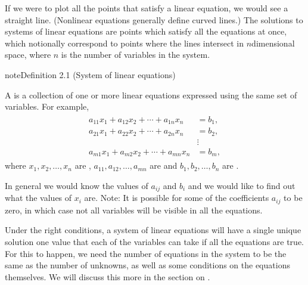 \documentclass[letterpaper,10pt,english]{jupyterBook}
\begin{document}
\sphinxAtStartPar
If we were to plot all the points that satisfy a linear equation, we would see a straight line. (Nonlinear equations generally define curved lines.) The solutions to systems of linear equations are points which satisfy all the equations at once, which notionally correspond to points where the lines intersect in \(n\)\sphinxhyphen{}dimensional space, where \(n\) is the number of variables in the system.
\label{_pages/2.0_Linear_systems:system-of-linear-equation-definition}
\begin{sphinxadmonition}{note}{Definition 2.1 (System of linear equations)}



\sphinxAtStartPar
A  is a collection of one or more linear equations expressed using the same set of variables. For example,
\begin{equation*}
\begin{split} \begin{align*}
    a_{11} x_1+a_{12} x_2+\cdots +a_{1n}x_n &=b_1, \\
    a_{21} x_1+a_{22} x_2+\cdots+a_{2n}x_n &=b_2, \\
    &\vdots \\
    a_{m1} x_1+a_{m2} x_2+\cdots+a_{mn}x_n &=b_m,
\end{align*} \end{split}
\end{equation*}
\sphinxAtStartPar
where \(x_1, x_2, \ldots, x_n\) are , \(a_{11}, a_{12}, \ldots, a_{mn}\) are  and \(b_1, b_2, \ldots, b_n\) are .
\end{sphinxadmonition}

\sphinxAtStartPar
In general we would know the values of \(a_{ij}\) and \(b_i\) and we would like to find out what the values of \(x_i\) are. Note: It is possible for some of the coefficients \(a_{ij}\) to be zero, in which case not all variables will be visible in all the equations.

\sphinxAtStartPar
Under the right conditions, a system of linear equations will have a single unique solution \sphinxhyphen{} one value that each of the variables can take if all the equations are true. For this to happen, we need the number of equations in the system to be the same as the number of unknowns, as well as some conditions on the equations themselves. We will discuss this more in the section on {\hyperref[\detokenize{_pages/2.6_Consistent_systems:consistent-inconsistent-and-indeterminate-systems-section}]{}}.
\end{document}
